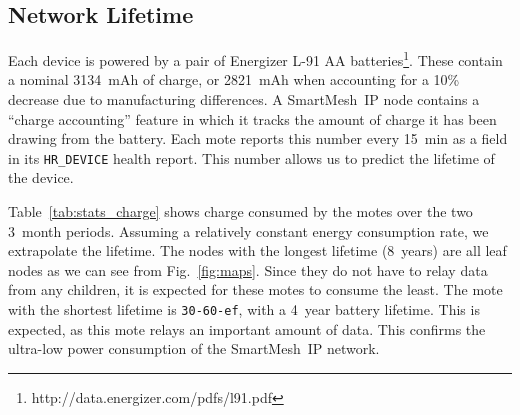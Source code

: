 \documentclass{elsarticle}
\newcommand{\smip}                {SmartMesh~IP\xspace}
\newcommand{\HRDEVICE}            {{\tt HR\_DEVICE}\xspace}
\begin{document}
\subsection{Network Lifetime}
\label{sec:lifetime}


Each device is powered by a pair of Energizer L-91 AA batteries\footnote{http://data.energizer.com/pdfs/l91.pdf}.
These contain a nominal 3134~mAh of charge, or 2821~mAh when accounting for a 10\% decrease due to manufacturing differences.
A \smip node contains a ``charge accounting'' feature in which it tracks the amount of charge it has been drawing from the battery.
Each mote reports this number every 15~min as a field in its \HRDEVICE health report.
This number allows us to predict the lifetime of the device.


Table~\ref{tab:stats_charge} shows charge consumed by the motes over the two 3~month periods.
Assuming a relatively constant energy consumption rate, we extrapolate the lifetime.
The nodes with the longest lifetime (8~years) are all leaf nodes as we can see from Fig.~\ref{fig:maps}.
Since they do not have to relay data from any children, it is expected for these motes to consume the least.
The mote with the shortest lifetime is {\tt 30-60-ef}, with a 4~year battery lifetime.
This is expected, as this mote relays an important amount of data.
This confirms the ultra-low power consumption of the \smip network.
\end{document}
